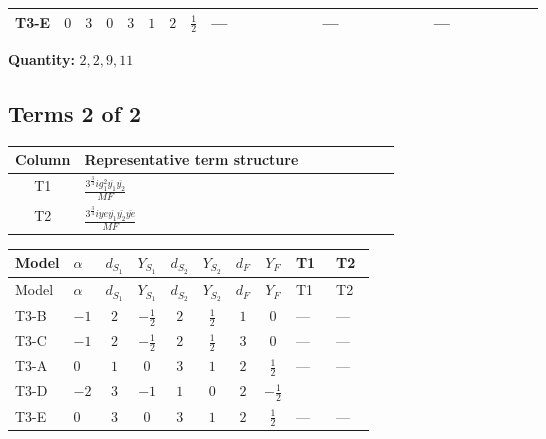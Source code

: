 \documentclass[8pt]{article}
\begin{document}
\begin{landscape}
\begin{longtable}{@{}llcccccc >{\raggedright\arraybackslash}p{0.21\linewidth} >{\raggedright\arraybackslash}p{0.21\linewidth} >{\raggedright\arraybackslash}p{0.21\linewidth}@{}}
\midrule
T3-E & $0$ & $3$ & $0$ & $3$ & $1$ & $2$ & $\frac{1}{2}$ & --- & --- & --- \\
\midrule
\bottomrule
\end{longtable}
\clearpage
\noindent\textbf{Quantity: }$\mathrm{2,2,9,11}$\par\smallskip
\subsection*{Terms 2 of 2}
\begin{center}
\begin{tabular}{@{}c >{\raggedright\arraybackslash}p{0.82\linewidth}@{}}
\toprule
Column & Representative term structure \\
\midrule
T1 & \(\displaystyle \frac{3^{\frac{3}{4}} i g_{1}^{2} \overline{y_{1}} \overline{y_{2}}}{MF}\) \\
\midrule
T2 & \(\displaystyle \frac{3^{\frac{3}{4}} i ye \overline{y_{1}} \overline{y_{2}} \overline{ye}}{MF}\) \\
\midrule
\bottomrule
\end{tabular}
\end{center}
\smallskip
\tiny
\begin{longtable}{@{}llcccccc >{\raggedright\arraybackslash}p{0.21\linewidth} >{\raggedright\arraybackslash}p{0.21\linewidth}@{}}
\toprule
Model & $\alpha$ & $d_{S_1}$ & $Y_{S_1}$ & $d_{S_2}$ & $Y_{S_2}$ & $d_F$ & $Y_F$ & T1 & T2 \\
\midrule
\endfirsthead
\toprule
Model & $\alpha$ & $d_{S_1}$ & $Y_{S_1}$ & $d_{S_2}$ & $Y_{S_2}$ & $d_F$ & $Y_F$ & T1 & T2 \\
\midrule
\endhead
T3-B & $-1$ & $2$ & $-\frac{1}{2}$ & $2$ & $\frac{1}{2}$ & $1$ & $0$ & --- & --- \\
\midrule
T3-C & $-1$ & $2$ & $-\frac{1}{2}$ & $2$ & $\frac{1}{2}$ & $3$ & $0$ & --- & --- \\
\midrule
T3-A & $0$ & $1$ & $0$ & $3$ & $1$ & $2$ & $\frac{1}{2}$ & --- & --- \\
\midrule
T3-D & $-2$ & $3$ & $-1$ & $1$ & $0$ & $2$ & $-\frac{1}{2}$ & \scriptsize\adjustbox{max width=\linewidth}{$\begin{gathered} - \frac{3^{\frac{3}{4}} i g_{1}^{2} \overline{y_{1}} \overline{y_{2}}}{8 MF}\end{gathered}$} & \scriptsize\adjustbox{max width=\linewidth}{$\begin{gathered} \frac{3^{\frac{3}{4}} i ye \overline{y_{1}} \overline{y_{2}} \overline{ye}}{12 MF}\end{gathered}$} \\
\midrule
T3-E & $0$ & $3$ & $0$ & $3$ & $1$ & $2$ & $\frac{1}{2}$ & --- & --- \\
\midrule
\bottomrule
\end{longtable}
\clearpage

\end{landscape}
\end{document}
